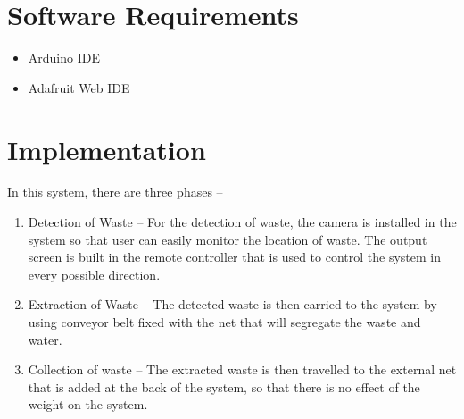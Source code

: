 \documentclass{article}
\begin{document}
\section{Software Requirements}
\begin{itemize}
	\item Arduino IDE
	\item Adafruit Web IDE
\newline
\newline
\end{itemize}


\section{Implementation}
In this system, there are three phases –
\newline
\begin{enumerate}
	\item Detection of Waste – For the detection of waste, the camera is installed in the system so that user can easily monitor the location of waste. The output screen is built in the remote controller that is used to control the system in every possible direction.
	\item Extraction of Waste – The detected waste is then carried to the system by using conveyor belt fixed with the net that will segregate the waste and water.
	\item Collection of waste – The extracted waste is then travelled to the external net that is added at the back of the system, so that there is no effect of the weight on the system.
\end{enumerate}

\newpage
\end{document}
